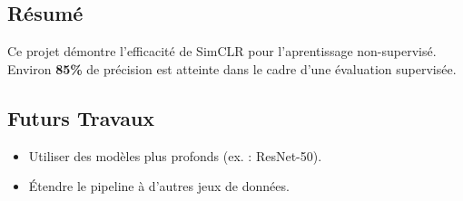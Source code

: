 \documentclass[12pt,a4paper]{article}
\begin{document}
\subsection{Résumé}
Ce projet démontre l’efficacité de SimCLR pour l’aprentissage non-supervisé. Environ \textbf{85\%} de précision est atteinte dans le cadre d’une évaluation supervisée.

\subsection{Futurs Travaux}
\begin{itemize}
    \item Utiliser des modèles plus profonds (ex. : ResNet-50).
    \item Étendre le pipeline à d’autres jeux de données.
\end{itemize}
\end{document}
